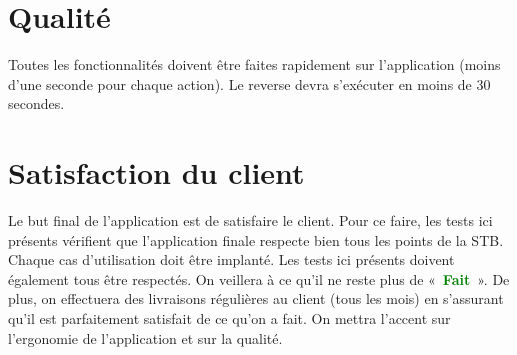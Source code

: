 \documentclass[hidelinks, a4paper,11pt,twoside,final]{article}
\begin{document}
\section{Qualité}
Toutes les fonctionnalités doivent être faites rapidement sur l’application (moins d’une seconde pour chaque action).
Le reverse devra s’exécuter en moins de 30 secondes.

\section{Satisfaction du client}
Le but final de l’application est de satisfaire le client. Pour ce faire, les tests ici présents vérifient que l’application finale respecte bien tous les points de la STB.
Chaque cas d’utilisation doit être implanté.
Les tests ici présents doivent également tous être respectés. On veillera à ce qu’il ne reste plus de «~\textcolor{green}{\textbf{Fait}}~».
De plus, on effectuera des livraisons régulières au client (tous les mois) en s’assurant qu’il est parfaitement satisfait de ce qu’on a fait.
On mettra l’accent sur l’ergonomie de l’application et sur la qualité.
\end{document}
